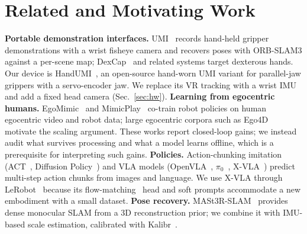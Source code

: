 \documentclass[conference,10pt]{IEEEtran}
\begin{document}
\section{Related and Motivating Work}
\textbf{Portable demonstration interfaces.} UMI~\cite{chi2024umi} records hand-held gripper demonstrations with a wrist fisheye
camera and recovers poses with ORB-SLAM3 against a per-scene map; DexCap~\cite{wang2024dexcap} and related systems target dexterous
hands. Our device is HandUMI~\cite{handumi_hw}, an open-source hand-worn UMI variant for parallel-jaw grippers with a
servo-encoder jaw. We replace its VR tracking with a wrist IMU and add a fixed head camera (Sec.~\ref{sec:hw}).
\textbf{Learning from egocentric humans.} EgoMimic~\cite{kareer2024egomimic} and MimicPlay~\cite{wang2023mimicplay} co-train robot
policies on human egocentric video and robot data; large egocentric corpora such as Ego4D~\cite{grauman2022ego4d} motivate the
scaling argument. These works report closed-loop gains; we instead audit what survives processing and what a model learns
offline, which is a prerequisite for interpreting such gains.
\textbf{Policies.} Action-chunking imitation (ACT~\cite{zhao2023act}, Diffusion Policy~\cite{chi2023diffusion}) and VLA models
(OpenVLA~\cite{kim2024openvla}, $\pi_0$~\cite{black2024pi0}, X-VLA~\cite{zheng2025xvla}) predict multi-step action chunks from
images and language. We use X-VLA through LeRobot~\cite{cadene2024lerobot} because its flow-matching~\cite{lipman2023flow} head
and soft prompts accommodate a new embodiment with a small dataset.
\textbf{Pose recovery.} MASt3R-SLAM~\cite{murai2025mast3rslam} provides dense monocular SLAM from a 3D reconstruction prior; we
combine it with IMU-based scale estimation, calibrated with Kalibr~\cite{furgale2013kalibr}.
\end{document}
